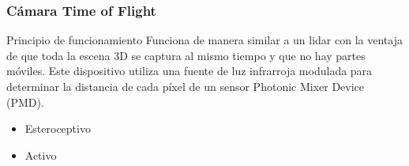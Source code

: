 \begin{frame}
    \frametitle{Cámara Time of Flight}
    
    \begin{block}{Principio de funcionamiento}
        Funciona de manera similar a un lidar con la ventaja de que toda la escena 3D se captura al mismo tiempo y que no hay partes móviles. Este dispositivo utiliza una fuente de luz infrarroja modulada para determinar la distancia de cada píxel de un sensor Photonic Mixer Device (PMD).
    \end{block}
    
    \begin{itemize}
        \item Esteroceptivo
        \item Activo
       
    \end{itemize}
    
\end{frame}